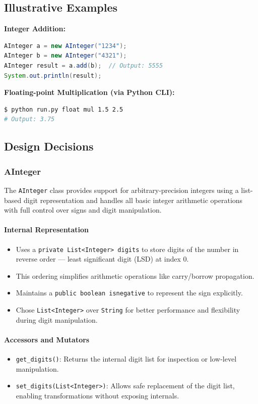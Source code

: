 \documentclass[12pt]{article}
\begin{document}
\subsection*{Illustrative Examples}
\textbf{Integer Addition:}
\begin{lstlisting}[language=Java]
AInteger a = new AInteger("1234");
AInteger b = new AInteger("4321");
AInteger result = a.add(b);  // Output: 5555
System.out.println(result);
\end{lstlisting}

\textbf{Floating-point Multiplication (via Python CLI):}
\begin{lstlisting}[language=bash]
$ python run.py float mul 1.5 2.5
# Output: 3.75
\end{lstlisting}
\subsection*{\textbf{\LARGE Design Decisions}}

\subsubsection*{\textbf{\large AInteger}}

The \texttt{AInteger} class provides support for arbitrary-precision integers using a list-based digit representation and handles all basic integer arithmetic operations with full control over signs and digit manipulation.

\paragraph*{\textbf{Internal Representation}}
\begin{itemize}
  \item Uses a \texttt{private List<Integer> digits} to store digits of the number in reverse order — least significant digit (LSD) at index 0.
  \item This ordering simplifies arithmetic operations like carry/borrow propagation.
  \item Maintains a \texttt{public boolean isnegative} to represent the sign explicitly.
  \item Chose \texttt{List<Integer>} over \texttt{String} for better performance and flexibility during digit manipulation.
\end{itemize}

\paragraph*{\textbf{Accessors and Mutators}}
\begin{itemize}
  \item \texttt{get\_digits()}: Returns the internal digit list for inspection or low-level manipulation.
  \item \texttt{set\_digits(List<Integer>)}: Allows safe replacement of the digit list, enabling transformations without exposing internals.
\end{itemize}
\end{document}
